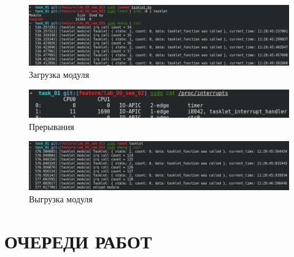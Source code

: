 \begin{figure}[H]
    \centering
    \includegraphics[scale=0.45]{img/part_01/insmod.png}
    \caption{Загрузка модуля}
\end{figure}

\begin{figure}[H]
    \centering
    \includegraphics[scale=0.7]{img/part_01/interrupt.png}
    \caption{Прерывания}
\end{figure}

\begin{figure}[H]
    \centering
    \includegraphics[scale=0.45]{img/part_01/rmmod.png}
    \caption{Выгрузка модуля}
\end{figure}

\section{ОЧЕРЕДИ РАБОТ}

